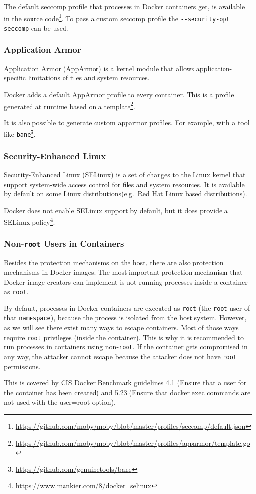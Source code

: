 \medskip

The default seccomp profile that processes in Docker containers get, is available in the source code\footnote{\url{https://github.com/moby/moby/blob/master/profiles/seccomp/default.json}}. To pass a custom seccomp profile the \lstinline{--security-opt seccomp} can be used.

\subsubsection{Application Armor}
Application Armor (AppArmor) is a kernel module that allows application-specific limitations of files and system resources.

Docker adds a default AppArmor profile to every container. This is a profile generated at runtime based on a template\footnote{\url{https://github.com/moby/moby/blob/master/profiles/apparmor/template.go}}.

\medskip

It is also possible to generate custom apparmor profiles. For example, with a tool like \lstinline{bane}\footnote{\url{https://github.com/genuinetools/bane}}.

\subsubsection{Security-Enhanced Linux}
Security-Enhanced Linux (SELinux) is a set of changes to the Linux kernel that support system-wide access control for files and system resources. It is available by default on some Linux distributions(e.g.\ Red Hat Linux based distributions).

\medskip

Docker does not enable SELinux support by default, but it does provide a SELinux policy\footnote{\url{https://www.mankier.com/8/docker_selinux}}.

\subsubsection{Non-\texorpdfstring{\lstinline{root}}{root} Users in Containers}\label{subsection:non-root-user}
Besides the protection mechanisms on the host, there are also protection mechanisms in Docker images. The most important protection mechanism that Docker image creators can implement is not running processes inside a container as \lstinline{root}.

By default, processes in Docker containers are executed as \lstinline{root} (the \lstinline{root} user of that \lstinline{namespace}), because the process is isolated from the host system. However, as we will see there exist many ways to escape containers. Most of those ways require \lstinline{root} privileges (inside the container). This is why it is recommended to run processes in containers using non-\lstinline{root}. If the container gets compromised in any way, the attacker cannot escape because the attacker does not have \lstinline{root} permissions.

\medskip

This is covered by CIS Docker Benchmark guidelines 4.1 (Ensure that a user for the container has been created) and 5.23 (Ensure that docker exec commands are not used with the user=root option).
